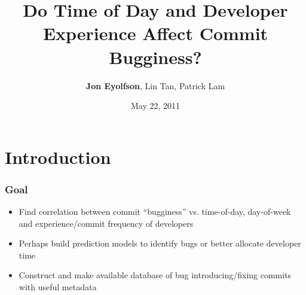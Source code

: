 \documentclass[aspectratio=43]{beamer}
\title{Do Time of Day and Developer Experience Affect Commit Bugginess?}
\author{{\bfseries Jon Eyolfson}, Lin Tan, Patrick Lam}
\institute{University of Waterloo}
\date{May 22, 2011}
\begin{document}
\begin{frame}[plain]
\titlepage
\end{frame}


\section{Introduction}
\begin{frame}
  \frametitle{Goal}
  
  \begin{itemize}

    \item Find correlation between commit ``bugginess'' vs. time-of-day,
          day-of-week and experience/commit frequency of developers

    \vspace{2em}

    \item Perhaps build prediction models to identify bugs or better allocate
          developer time

    \vspace{2em}

    \item Construct and make available database of bug introducing/fixing
          commits with useful metadata

  \end{itemize}
\end{frame}
\end{document}
